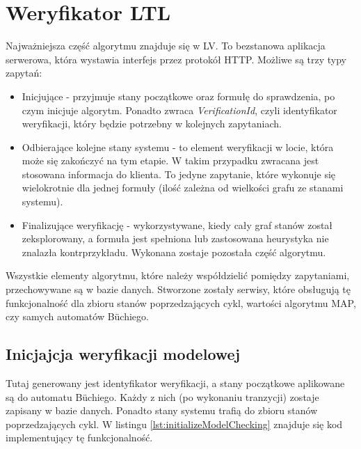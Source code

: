 \newpage


\section{Weryfikator LTL}

Najważniejsza część algorytmu znajduje się w LV.
To bezstanowa aplikacja serwerowa, która wystawia interfejs przez protokół HTTP.
Możliwe są trzy typy zapytań:
\begin{itemize}
\item Inicjujące - przyjmuje stany początkowe oraz formułę do sprawdzenia, po czym inicjuje algorytm. Ponadto zwraca \textit{VerificationId}, czyli identyfikator weryfikacji, który będzie potrzebny w kolejnych zapytaniach.
\item Odbierające kolejne stany systemu - to element weryfikacji w locie, która może się zakończyć na tym etapie. W takim przypadku zwracana jest stosowana informacja do klienta. To jedyne zapytanie, które wykonuje się wielokrotnie dla jednej formuły (ilość zależna od wielkości grafu ze stanami systemu).
\item Finalizujące weryfikację - wykorzystywane, kiedy cały graf stanów został zeksplorowany, a formuła jest spełniona lub zastosowana heurystyka nie znalazła kontrprzykładu. Wykonana zostaje pozostała część algorytmu.
\end{itemize}

Wszystkie elementy algorytmu, które należy współdzielić pomiędzy zapytaniami, przechowywane są w bazie danych.
Stworzone zostały serwisy, które obsługują tę funkcjonalność dla zbioru stanów poprzedzających cykl, wartości algorytmu MAP, czy samych automatów Büchiego.


\subsection{Inicjajcja weryfikacji modelowej}

Tutaj generowany jest identyfikator weryfikacji, a stany początkowe aplikowane są do automatu Büchiego.
Każdy z nich (po wykonaniu tranzycji) zostaje zapisany w bazie danych.
Ponadto stany systemu trafią do zbioru stanów poprzedzających cykl.
W listingu \ref{lst:initializeModelChecking} znajduje się kod implementujący tę funkcjonalność.

